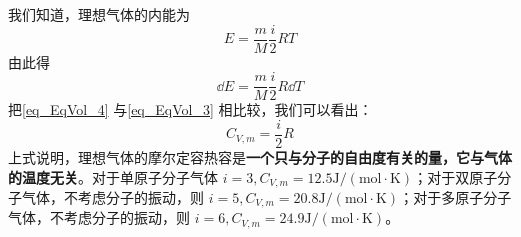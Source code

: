 我们知道，理想气体的内能为
\begin{equation}
E=\frac{m}{M} \frac{i}{2} R T
\end{equation}
由此得
\begin{equation} \label{eq_EqVol_4}
\dd E=\frac{m}{M} \frac{i}{2} R \dd T
\end{equation}
把\autoref{eq_EqVol_4} 与\autoref{eq_EqVol_3} 相比较，我们可以看出：
\begin{equation}
C_{V, m}=\frac{i}{2} R
\end{equation}
上式说明，理想气体的摩尔定容热容是\textbf{一个只与分子的自由度有关的量，它与气体的温度无关}。对于单原子分子气体 $i=3, C_{V, m}=12.5 \mathrm{J} /(\mathrm{mol} \cdot \mathrm{K})$；对于双原子分子气体，不考虑分子的振动，则 $i=5, C_{V, {m}}=20.8 \mathrm{J} /(\mathrm{mol} \cdot \mathrm{K})$；对于多原子分子气体，不考虑分子的振动，则 $i=6, C_{V, {m}}=24.9 \mathrm{J} /(\mathrm{mol} \cdot \mathrm{K})$。

